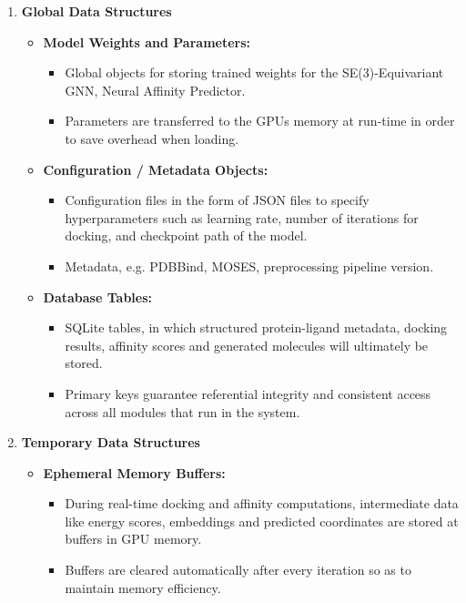 \documentclass[12pt,a4]{report}
\begin{document}
\begin{enumerate}[label=\textbf{\Alph*.}, leftmargin=1.2cm]
    \vspace{0.4cm}
    \item \textbf{Global Data Structures}
    \begin{itemize}
        \item \textbf{Model Weights and Parameters:}
        \begin{itemize}
            \item Global objects for storing trained weights for the SE(3)-Equivariant GNN, Neural Affinity Predictor.
            \item Parameters are transferred to the GPUs memory at run-time in order to save overhead when loading.
        \end{itemize}

        \item \textbf{Configuration / Metadata Objects:}
        \begin{itemize}
            \item Configuration files in the form of JSON files to specify hyperparameters such as learning rate, number of iterations for docking, and checkpoint path of the model.
            \item Metadata, e.g. PDBBind, MOSES, preprocessing pipeline version.
        \end{itemize}

        \item \textbf{Database Tables:}
        \begin{itemize}
            \item SQLite tables, in which structured protein-ligand metadata, docking results, affinity scores and generated molecules will ultimately be stored.
            \item Primary keys guarantee referential integrity and consistent access across all modules that run in the system.
        \end{itemize}
    \end{itemize}

    \vspace{0.4cm}
    \item \textbf{Temporary Data Structures}
    \begin{itemize}
        \item \textbf{Ephemeral Memory Buffers:}
        \begin{itemize}
            \item During real-time docking and affinity computations, intermediate data like energy scores, embeddings and predicted coordinates are stored at buffers in GPU memory.
            \item Buffers are cleared automatically after every iteration so as to maintain memory efficiency.
        \end{itemize}


\end{itemize}
\end{enumerate}
\end{document}
